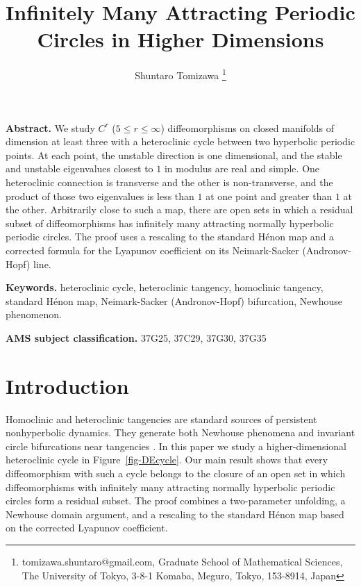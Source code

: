 \documentclass[11pt,a4paper]{article}
\theoremstyle{plain}
\theoremstyle{definition}
\theoremstyle{plain}
\numberwithin{equation}{section}
\begin{document}
\title{\textbf{
Infinitely Many Attracting Periodic Circles in Higher Dimensions
}}

\author{Shuntaro Tomizawa
\footnote{
tomizawa.shuntaro@gmail.com, Graduate School of Mathematical Sciences, The University of Tokyo, 3-8-1 Komaba, Meguro, Tokyo, 153-8914, Japan
}}

\maketitle

\noindent \textbf{Abstract.}
We study $C^r$ ($5 \le r \le \infty$) diffeomorphisms on closed manifolds of dimension at least three with a heteroclinic cycle between two hyperbolic periodic points. At each point, the unstable direction is one dimensional, and the stable and unstable eigenvalues closest to $1$ in modulus are real and simple. One heteroclinic connection is transverse and the other is non-transverse, and the product of those two eigenvalues is less than $1$ at one point and greater than $1$ at the other. Arbitrarily close to such a map, there are open sets in which a residual subset of diffeomorphisms has infinitely many attracting normally hyperbolic periodic circles. The proof uses a rescaling to the standard H\'enon map and a corrected formula for the Lyapunov coefficient on its Neimark-Sacker (Andronov-Hopf) line.

\medskip

\noindent \textbf{Keywords.}
heteroclinic cycle, heteroclinic tangency, homoclinic tangency, standard H\'enon map, Neimark-Sacker (Andronov-Hopf) bifurcation, Newhouse phenomenon.

\medskip

\noindent \textbf{AMS subject classification.}
37G25, 37C29, 37G30, 37G35

\tableofcontents


\section{Introduction}
\label{sec-intro}

Homoclinic and heteroclinic tangencies are standard sources of persistent nonhyperbolic dynamics. They generate both Newhouse phenomena and invariant circle bifurcations near tangencies \cite{Newhouse1974,GG2000,GG2004,GSS2002,GSS2006,Tatjer2001,GST2008}. In this paper we study a higher-dimensional heteroclinic cycle in Figure~\ref{fig-DEcycle}. Our main result shows that every diffeomorphism with such a cycle belongs to the closure of an open set in which diffeomorphisms with infinitely many attracting normally hyperbolic periodic circles form a residual subset. The proof combines a two-parameter unfolding, a Newhouse domain argument, and a rescaling to the standard H\'enon map based on the corrected Lyapunov coefficient.
\end{document}
